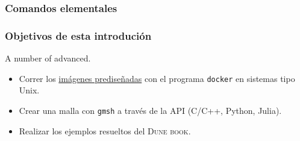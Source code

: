 \begin{frame}[fragile]
	\frametitle{Comandos elementales}
\end{frame}

\begin{frame}
	\frametitle{Objetivos de esta introdución}
	A number of advanced.
	\begin{itemize}
		\item Correr los \href{https://github.com/orgs/cpp-review-dune/packages}{imágenes prediseñadas} con el programa \lstinline{docker} en sistemas tipo Unix.
		\item Crear una malla con \lstinline{gmsh} a través de la API (C/C++, Python, Julia).
		\item Realizar los ejemplos resueltos del \textsc{Dune book}.
	\end{itemize}
\end{frame}

